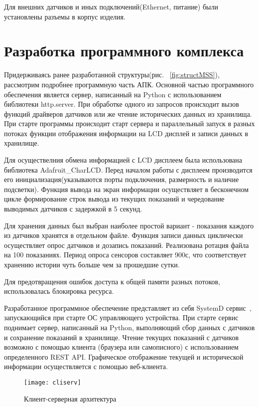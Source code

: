 Для внешних датчиков и иных подключений(Ethernet, питание) были установлены разъемы в корпус изделия. 

\section{Разработка программного комплекса}
Придерживаясь ранее разработанной структуры(рис. ~\ref{fig:structMSS}), рассмотрим подробнее программную часть АПК. 
Основной частью программного обеспечения является сервер, написанный на Python с использованием библиотеки http.server. При обработке одного из запросов происходит вызов функций драйверов датчиков или же чтение исторических данных из хранилища.
При старте программы происходит старт сервера и параллельный запуск в разных потоках функции отображения информации на LCD дисплей и записи данных в хранилище. 

Для осуществелния обмена информацией с LCD  дисплеем была использована библиотека Adafruit\_CharLCD. Перед началом работы с дисплеем производится его инициализация(указываются порты подключения, размерность и наличие подсветки). Функция вывода на экран информации осуществляет в бесконечном цикле формирование строк вывода из текущих показаний и чередование выводимых датчиков с задержкой в 5 секунд. 

Для хранения данных был выбран наиболее простой вариант - показания каждого из датчиков хранятся в отдельном файле. Функция записи данных циклически осуществляет опрос датчиков и дозапись показаний. Реализована ротация файла на 100 показаниях. Период опроса сенсоров составляет 900с, что соответствует хранению истории чуть больше чем за прошедшие сутки. 

Для предотвращения ошибок доступа к общей памяти разных потоков, использовалась блокировка ресурса.

Разработанное программное обеспечение представляет из себя SystemD сервис~\cite{SystemD}, запускающийся при старте ОС управляющего устройства. При старте сервис поднимает сервер, написанный на Python, выполняющий сбор данных с датчиков и сохранение показаний в хранилище. Чтение текущих показаний с датчиков возможно с помощью клиента (браузера или самописного) с использованием определенного REST API. Графическое отображение текущей и исторической информации осуществляется с помощью веб-клиента. 

\begin{figure}[h]
	\centering
	\texttt{[image: cliserv]}
	\caption{Клиент-серверная архитектура}
	\label{fig:cliserv}
\end{figure}

